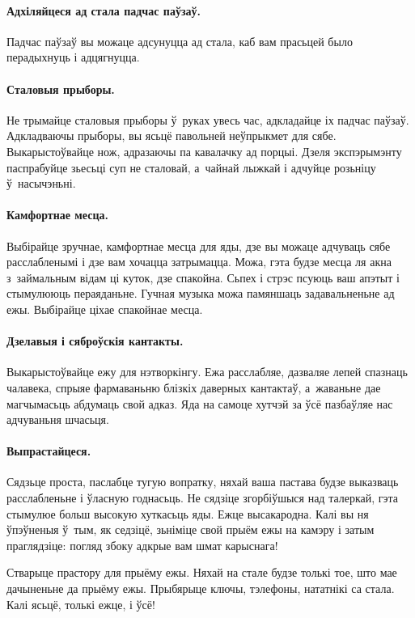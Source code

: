 \paragraph{Адхіляйцеся ад стала падчас паўзаў.}
Падчас паўзаў вы можаце адсунуцца ад стала, каб вам прасьцей было перадыхнуць і адцягнуцца.

\paragraph{Сталовыя прыборы.}
Не трымайце сталовыя прыборы ў~руках увесь час, адкладайце іх падчас паўзаў. Адкладваючы прыборы, вы ясьцё павольней неўпрыкмет для сябе. Выкарыстоўвайце нож, адразаючы па кавалачку ад порцыі. Дзеля экспэрымэнту паспрабуйце зьесьці суп не сталовай, а~чайнай лыжкай і адчуйце розьніцу ў~насычэньні.

\paragraph{Камфортнае месца.}
Выбірайце зручнае, камфортнае месца для яды, дзе вы можаце адчуваць сябе расслабленымі і дзе вам хочацца затрымацца. Можа, гэта будзе месца ля акна з~займальным відам ці куток, дзе спакойна. Сьпех і стрэс псуюць ваш апэтыт і стымулююць пераяданьне. Гучная музыка можа памяншаць задавальненьне ад ежы. Выбірайце ціхае спакойнае месца.

\paragraph{Дзелавыя і сяброўскія кантакты.}
Выкарыстоўвайце ежу для нэтворкінгу. Ежа расслабляе, дазваляе лепей спазнаць чалавека, спрыяе фармаваньню блізкіх даверных кантактаў, а~жаваньне дае магчымасьць абдумаць свой адказ. Яда на самоце хутчэй за ўсё пазбаўляе нас адчуваньня шчасьця.

\paragraph{Выпрастайцеся.}
Сядзьце проста, паслабце тугую вопратку, няхай ваша пастава будзе выказваць расслабленьне і ўласную годнасьць. Не сядзіце згорбіўшыся над талеркай, гэта стымулюе больш высокую хуткасьць яды. Ежце высакародна. Калі вы ня ўпэўненыя ў~тым, як седзіцё, зьніміце свой прыём ежы на камэру і затым праглядзіце: погляд збоку адкрые вам шмат карыснага!

Стварыце прастору для прыёму ежы. Няхай на стале будзе толькі тое, што мае дачыненьне да прыёму ежы. Прыбярыце ключы, тэлефоны, нататнікі са стала. Калі ясьцё, толькі ежце, і ўсё!

